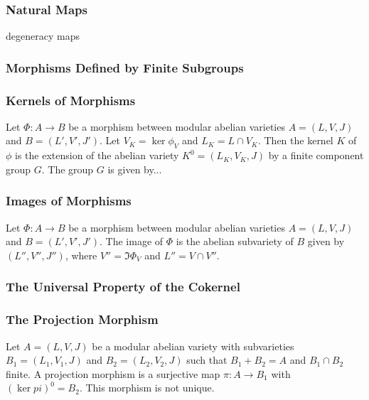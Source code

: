\documentclass{article}
\begin{document}
\subsubsection{Natural Maps}

degeneracy maps

\subsubsection{Morphisms Defined by Finite Subgroups}

\subsubsection{Kernels of Morphisms}\label{sec:kernelmodabvar}

Let $\Phi:A\to B$ be a morphism between modular abelian varieties $A=(L, V, J)$
and $B=(L', V', J')$. Let $V_K=\ker \phi_V$ and $L_K=L\cap V_K$. Then the
kernel $K$ of $\phi$ is the extension of the abelian variety $K^0 = (L_K, V_K,
J)$ by a finite component group $G$. The group $G$ is given by...

\subsubsection{Images of Morphisms}

Let $\Phi:A\to B$ be a morphism between modular abelian varieties $A=(L, V, J)$
and $B=(L', V', J')$. The image of $\Phi$ is the abelian subvariety of $B$
given by $(L'', V'', J'')$, where $V''=\Im \Phi_V$ and $L''=V\cap V''$.

\subsubsection{The Universal Property of the Cokernel}


\subsubsection{The Projection Morphism} 

Let $A=(L, V, J)$ be a modular abelian variety with subvarieties $B_1=(L_1,
V_1, J)$ and $B_2=(L_2, V_2, J)$ such that $B_1+B_2=A$ and $B_1\cap B_2$
finite. A projection morphism is a surjective map $\pi:A\to B_1$ with $(\ker
pi)^0 = B_2$. This morphism is not unique.
\end{document}
